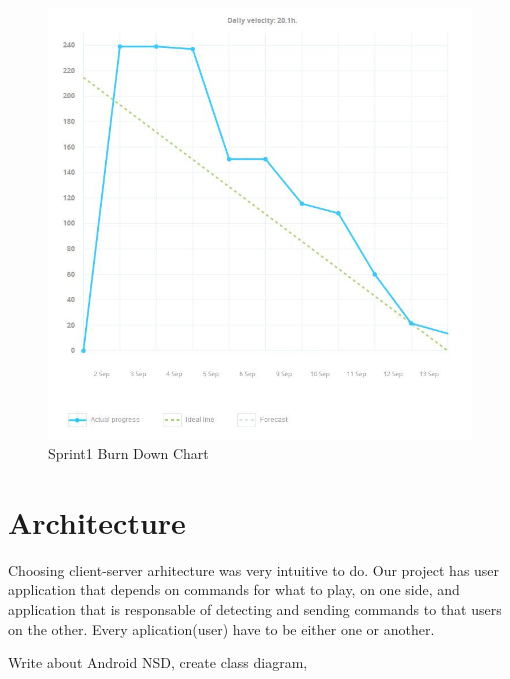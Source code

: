 \begin{figure}[!t]
	\centering
		\includegraphics[width=16cm]{burn_down_chart.jpg}
	\caption{Sprint1 Burn Down Chart}
	\label{fig:sprint1_burn_down_chart}
\end{figure}

\section{Architecture}

Choosing client-server arhitecture was very intuitive to do.
Our project has user application that depends on commands for what to play, on one side, and application that is responsable of detecting and sending commands to that users on the other.
Every aplication(user) have to be either one or another. 

Write about Android NSD, create class diagram, 


